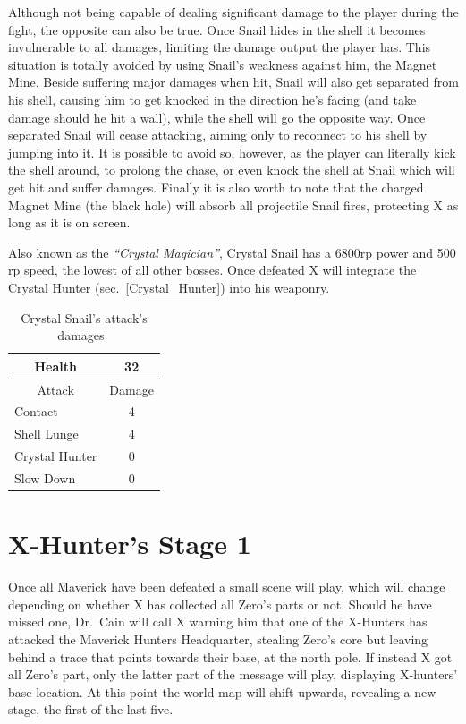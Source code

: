 Although not being capable of dealing significant damage to the player during the fight, the opposite can also be true. Once Snail hides in the shell it becomes invulnerable to all damages, limiting the damage output the player has. This situation is totally avoided by using Snail's weakness against him, the Magnet Mine. Beside suffering major damages when hit, Snail will also get separated from his shell, causing him to get knocked in the direction he's facing (and take damage should he hit a wall), while the shell will go the opposite way. Once separated Snail will cease attacking, aiming only to reconnect to his shell by jumping into it. It is possible to avoid so, however, as the player can literally kick the shell around, to prolong the chase, or even knock the shell at Snail which will get hit and suffer damages. Finally it is also worth to note that the charged Magnet Mine (the black hole) will absorb all projectile Snail fires, protecting X as long as it is on screen.

Also known as the \textit{``Crystal Magician''}, Crystal Snail has a 6800rp power and 500 rp speed, the lowest of all other bosses. Once defeated X will integrate the Crystal Hunter (sec.~\ref{Crystal_Hunter}) into his weaponry.

\begin{table}[htp]
	\centering
	\begin{tabular}[h]{l c}
		\toprule
		\multicolumn{1}{c}{Health}  & 32 \\
		\midrule
		\multicolumn{1}{c}{Attack} & \multicolumn{1}{c}{Damage}\\
		Contact & 4 \\
		Shell Lunge & 4\\
		Crystal Hunter & 0\\
		Slow Down & 0\\
		\bottomrule
	\end{tabular}
	\caption{Crystal Snail's attack's damages~\cite{wiki:Crystal_snail}}
\end{table}

\section{X-Hunter's Stage 1}

Once all Maverick have been defeated a small scene will play, which will change depending on whether X has collected all Zero's parts or not. Should he have missed one, Dr.~Cain will call X warning him that one of the X-Hunters has attacked the Maverick Hunters Headquarter, stealing Zero's core but leaving behind a trace that points towards their base, at the north pole. If instead X got all Zero's part, only the latter part of the message will play, displaying X-hunters' base location. At this point the world map will shift upwards, revealing a new stage, the first of the last five.

